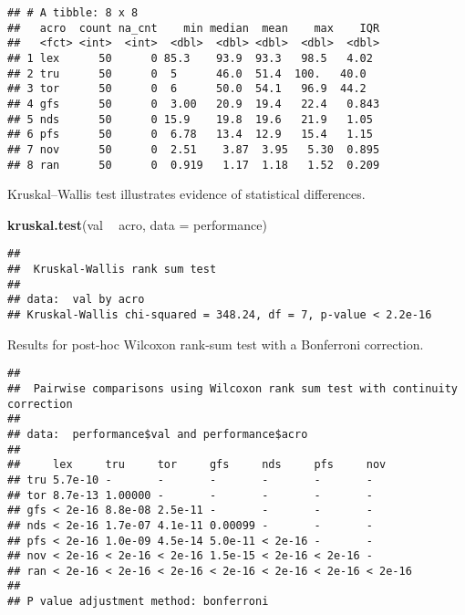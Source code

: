 \documentclass[]{book}
\newenvironment{Shaded}{\begin{snugshade}}{\end{snugshade}}
\newcommand{\DataTypeTok}[1]{\textcolor[rgb]{0.13,0.29,0.53}{#1}}
\newcommand{\KeywordTok}[1]{\textcolor[rgb]{0.13,0.29,0.53}{\textbf{#1}}}
\newcommand{\NormalTok}[1]{#1}
\newcommand{\OperatorTok}[1]{\textcolor[rgb]{0.81,0.36,0.00}{\textbf{#1}}}
\newcommand{\OtherTok}[1]{\textcolor[rgb]{0.56,0.35,0.01}{#1}}
\newcommand{\StringTok}[1]{\textcolor[rgb]{0.31,0.60,0.02}{#1}}
\begin{document}
\begin{verbatim}
## # A tibble: 8 x 8
##   acro  count na_cnt    min median  mean    max    IQR
##   <fct> <int>  <int>  <dbl>  <dbl> <dbl>  <dbl>  <dbl>
## 1 lex      50      0 85.3    93.9  93.3   98.5   4.02 
## 2 tru      50      0  5      46.0  51.4  100.   40.0  
## 3 tor      50      0  6      50.0  54.1   96.9  44.2  
## 4 gfs      50      0  3.00   20.9  19.4   22.4   0.843
## 5 nds      50      0 15.9    19.8  19.6   21.9   1.05 
## 6 pfs      50      0  6.78   13.4  12.9   15.4   1.15 
## 7 nov      50      0  2.51    3.87  3.95   5.30  0.895
## 8 ran      50      0  0.919   1.17  1.18   1.52  0.209
\end{verbatim}

Kruskal--Wallis test illustrates evidence of statistical differences.

\begin{Shaded}
\begin{Highlighting}[]
\KeywordTok{kruskal.test}\NormalTok{(val }\OperatorTok{~}\StringTok{ }\NormalTok{acro, }\DataTypeTok{data =}\NormalTok{ performance)}
\end{Highlighting}
\end{Shaded}

\begin{verbatim}
## 
##  Kruskal-Wallis rank sum test
## 
## data:  val by acro
## Kruskal-Wallis chi-squared = 348.24, df = 7, p-value < 2.2e-16
\end{verbatim}

Results for post-hoc Wilcoxon rank-sum test with a Bonferroni correction.

\begin{Shaded}
\end{Shaded}

\begin{verbatim}
## 
##  Pairwise comparisons using Wilcoxon rank sum test with continuity correction 
## 
## data:  performance$val and performance$acro 
## 
##     lex     tru     tor     gfs     nds     pfs     nov    
## tru 5.7e-10 -       -       -       -       -       -      
## tor 8.7e-13 1.00000 -       -       -       -       -      
## gfs < 2e-16 8.8e-08 2.5e-11 -       -       -       -      
## nds < 2e-16 1.7e-07 4.1e-11 0.00099 -       -       -      
## pfs < 2e-16 1.0e-09 4.5e-14 5.0e-11 < 2e-16 -       -      
## nov < 2e-16 < 2e-16 < 2e-16 1.5e-15 < 2e-16 < 2e-16 -      
## ran < 2e-16 < 2e-16 < 2e-16 < 2e-16 < 2e-16 < 2e-16 < 2e-16
## 
## P value adjustment method: bonferroni
\end{verbatim}
\end{document}
